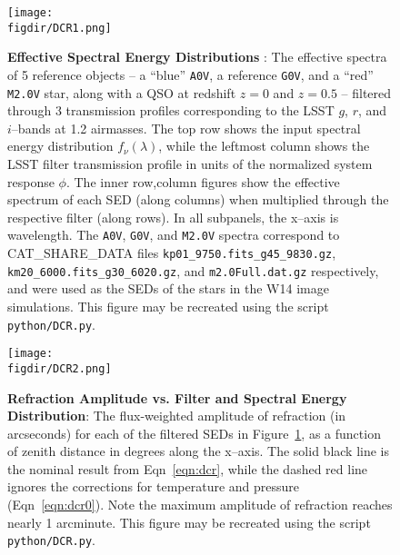 \documentclass[prd, nofootinbib, floatfix, 11pt, tightenlines, times]{article}
\def\figdir{../figures}
\begin{document}
\begin{figure}[!t]
  \centering
  \texttt{[image: \\figdir/DCR1.png]}
  \caption{{\bf Effective Spectral Energy Distributions} : The
    effective spectra of 5 reference objects -- a ``blue'' {\tt A0V},
    a reference {\tt G0V}, and a ``red'' {\tt M2.0V} star, along with
    a QSO at redshift $z=0$ and $z=0.5$ -- filtered through 3
    transmission profiles corresponding to the LSST $g$, $r$, and
    $i$--bands at 1.2 airmasses.  The top row shows the input spectral
    energy distribution $f_\nu(\lambda)$, while the leftmost column
    shows the LSST filter transmission profile in units of the
    normalized system response $\phi$.  The inner row,column figures
    show the effective spectrum of each SED (along columns) when
    multiplied through the respective filter (along rows).  In all
    subpanels, the x--axis is wavelength.  The {\tt A0V}, {\tt G0V},
    and {\tt M2.0V} spectra correspond to {CAT\_SHARE\_DATA} files
    {\tt kp01\_9750.fits\_g45\_9830.gz}, {\tt
      km20\_6000.fits\_g30\_6020.gz}, and {\tt m2.0Full.dat.gz}
    respectively, and were used as the SEDs of the stars in the W14
    image simulations.  This figure may be recreated using the script
    {\tt python/DCR.py}.}
  \label{fig:spectra}
\end{figure}
\begin{figure}[!t]
  \centering
  \texttt{[image: \\figdir/DCR2.png]}
  \caption{{\bf Refraction Amplitude vs. Filter and Spectral Energy
      Distribution}: The flux-weighted amplitude of refraction (in
    arcseconds) for each of the filtered SEDs in
    Figure~\ref{fig:spectra}, as a function of zenith distance in
    degrees along the x--axis.  The solid black line is the nominal
    result from Eqn~\ref{eqn:dcr}, while the dashed red line ignores
    the corrections for temperature and pressure (Eqn~\ref{eqn:dcr0}).
    Note the maximum amplitude of refraction reaches nearly 1
    arcminute.  This figure may be recreated using the script {\tt
      python/DCR.py}.}
  \label{fig:refraction}
\end{figure}
\end{document}
